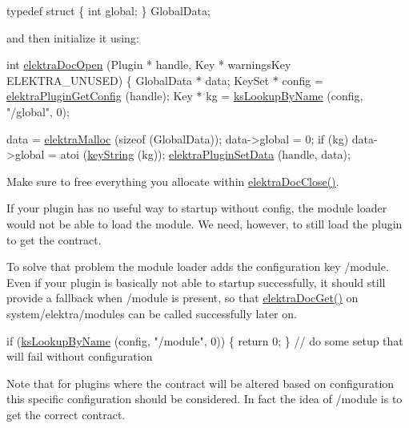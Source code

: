 \begin{DoxyCodeInclude}
\textcolor{keyword}{typedef} \textcolor{keyword}{struct}
\{
        \textcolor{keywordtype}{int} global;
\} GlobalData;
\end{DoxyCodeInclude}
 and then initialize it using\+:


\begin{DoxyCodeInclude}
\textcolor{keywordtype}{int} \hyperlink{group__plugin_ga23c2eb3584e38a4d494eb8f91e5e3d8d}{elektraDocOpen} (Plugin * handle, Key * warningsKey ELEKTRA\_UNUSED)
\{
        GlobalData * data;
        KeySet * config = \hyperlink{group__plugin_ga644bead796506c172817724051c977c9}{elektraPluginGetConfig} (handle);
        Key * kg = \hyperlink{group__keyset_gad65d2cdcbb5381194a1688e169af8a83}{ksLookupByName} (config, \textcolor{stringliteral}{"/global"}, 0);

        data = \hyperlink{internal_8c_a35cdc2e5caed3454cb73b4fc7f37858c}{elektraMalloc} (\textcolor{keyword}{sizeof} (GlobalData));
        data->global = 0;
        \textcolor{keywordflow}{if} (kg) data->global = atoi (\hyperlink{group__keyvalue_ga880936f2481d28e6e2acbe7486a21d05}{keyString} (kg));
        \hyperlink{group__plugin_gaf4b941a52ff55d0ca2a9158d90208ef2}{elektraPluginSetData} (handle, data);
\end{DoxyCodeInclude}
 Make sure to free everything you allocate within \hyperlink{group__plugin_ga1236aefe5b2baf8b7bf636ba5aa9ea29}{elektra\+Doc\+Close()}.

If your plugin has no useful way to startup without config, the module loader would not be able to load the module. We need, however, to still load the plugin to get the contract.

To solve that problem the module loader adds the configuration key /module. Even if your plugin is basically not able to startup successfully, it should still provide a fallback when /module is present, so that \hyperlink{group__plugin_gacb69f3441c6d84241b4362f958fbe313}{elektra\+Doc\+Get()} on system/elektra/modules can be called successfully later on.


\begin{DoxyCodeInclude}
        \textcolor{keywordflow}{if} (\hyperlink{group__keyset_gad65d2cdcbb5381194a1688e169af8a83}{ksLookupByName} (config, \textcolor{stringliteral}{"/module"}, 0))
        \{
                \textcolor{keywordflow}{return} 0;
        \}
        \textcolor{comment}{// do some setup that will fail without configuration}
\end{DoxyCodeInclude}
 Note that for plugins where the contract will be altered based on configuration this specific configuration should be considered. In fact the idea of /module is to get the correct contract.


